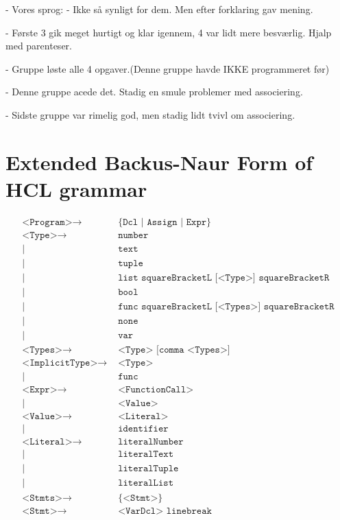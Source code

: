 - Vores sprog: 
- Ikke så synligt for dem. Men efter forklaring gav mening.

- Første 3 gik meget hurtigt og klar igennem, 4 var lidt mere besværlig. Hjalp med parenteser.

- Gruppe løste alle 4 opgaver.(Denne gruppe havde IKKE programmeret før)

- Denne gruppe acede det. Stadig en smule problemer med associering.

- Sidste gruppe var rimelig god, men stadig lidt tvivl om associering.

\section{Extended Backus-Naur Form of HCL grammar}
\label{AppendixEBNF}
\begin{align*}
	\texttt{<Program>}\to & \texttt{ \{Dcl | Assign | Expr\}}\\
	\texttt{<Type>}\to & \texttt{ number}\\
	| & \texttt{ text}\\
	| & \texttt{ tuple}\\
	| & \texttt{ list squareBracketL [<Type>] squareBracketR}\\
	| & \texttt{ bool}\\
	| & \texttt{ func squareBracketL [<Types>] squareBracketR}\\
	| & \texttt{ none}\\
	| & \texttt{ var}\\
	\texttt{<Types>}\to & \texttt{ <Type> [comma <Types>]}\\
	\texttt{<ImplicitType>}\to & \texttt{ <Type>}\\
	| & \texttt{ func}\\
	\texttt{<Expr>}\to & \texttt{ <FunctionCall>}\\
	| & \texttt{ <Value>}\\
	\texttt{<Value>}\to & \texttt{ <Literal>}\\
	| & \texttt{ identifier}\\
	\texttt{<Literal>}\to & \texttt{ literalNumber}\\
	| & \texttt{ literalText}\\
	| & \texttt{ literalTuple}\\
	| & \texttt{ literalList}\\
	\texttt{<Stmts>}\to & \texttt{ \{<Stmt>\}}\\
	\texttt{<Stmt>}\to & \texttt{ <VarDcl> linebreak}\\

\end{align*}
